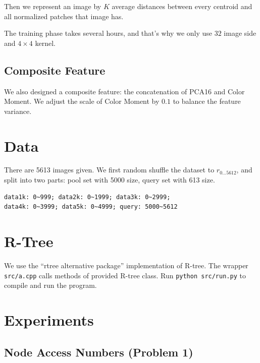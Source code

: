 \documentclass{acm_proc_article-sp}
\begin{document}
Then we represent an image by $K$ average distances between every centroid and
all normalized patches that image has.

The training phase takes several hours, and that's why we only use $32$ image
side and $4\times 4$ kernel.

\subsection{Composite Feature}
We also designed a composite feature: the concatenation of PCA16 and
Color Moment. We adjust the scale of Color Moment by $0.1$ to balance the
feature variance.

\section{Data}

There are 5613 images given. We first random shuffle the dataset to $r_{0\dots
5612}$, and split
into two parts: pool set with 5000 size, query set with 613 size.
\begin{verbatim}data1k: 0~999; data2k: 0~1999; data3k: 0~2999;
data4k: 0~3999; data5k: 0~4999; query: 5000~5612\end{verbatim}

\section{R-Tree}
We use the ``rtree alternative package'' implementation of R-tree.
The wrapper \texttt{src/a.cpp} calls methods of provided R-tree class.
Run \texttt{python src/run.py} to compile and run the program.

\section{Experiments}

\subsection{Node Access Numbers (Problem 1)}
\end{document}
